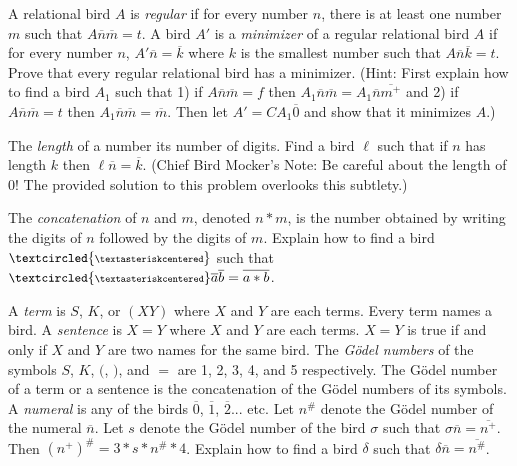 \documentclass[12pt, letterpaper]{article}
\begin{document}
\begin{prob}{24.10}
A relational bird $A$ is \emph{regular} if for every number $n$, there is at least one number $m$ such that $A\overline{n}\overline{m} = t$. A bird $A'$ is a \emph{minimizer} of a regular relational bird $A$ if for every number $n$, $A'\overline{n} = \overline{k}$ where $k$ is the smallest number such that $A\overline{n}\overline{k} = t$. Prove that every regular relational bird has a minimizer. (Hint: First explain how to find a bird $A_1$ such that 1) if $A\overline{n}\overline{m} = f$ then $A_1\overline{n}\overline{m} = A_1\overline{n}\overline{m^+}$ and 2) if $A\overline{n}\overline{m} = t$ then $A_1\overline{n}\overline{m} = \overline{m}$. Then let $A' = CA_1\overline{0}$ and show that it minimizes $A$.)
\end{prob}

\begin{prob}{24.11}
The \emph{length} of a number its number of digits. Find a bird $\ell$ such that if $n$ has length $k$ then $\ell\overline{n} = \overline{k}$. (Chief Bird Mocker's Note: Be careful about the length of 0! The provided solution to this problem overlooks this subtlety.)
\end{prob}

\begin{prob}{24.12}
The \emph{concatenation} of $n$ and $m$, denoted $n \ast m$, is the number obtained by writing the digits of $n$ followed by the digits of $m$. Explain how to find a bird $\small \textcircled{\scriptsize \textasteriskcentered}$ such that $\small \textcircled{\scriptsize \textasteriskcentered}\overline{a}\overline{b} = \overline{a \ast b}$.
\end{prob}

\begin{prob}{25.1}
A \emph{term} is $S$, $K$, or $(XY)$ where $X$ and $Y$ are each terms. Every term names a bird. A \emph{sentence} is $X = Y$ where $X$ and $Y$ are each terms. $X = Y$ is true if and only if $X$ and $Y$ are two names for the same bird. The \emph{G\"{o}del numbers} of the symbols $S$, $K$, $($, $)$, and $=$ are 1, 2, 3, 4, and 5 respectively. The G\"{o}del number of a term or a sentence is the concatenation of the G\"{o}del numbers of its symbols. A \emph{numeral} is any of the birds $\overline{0}$, $\overline{1}$, $\overline{2}$... etc. Let $n^\#$ denote the G\"{o}del number of the numeral $\overline{n}$. Let $s$ denote the G\"{o}del number of the bird $\sigma$ such that $\sigma \overline{n} = \overline{n^+}$. Then $(n^+)^\# = 3 \ast s \ast n^\# \ast 4$. Explain how to find a bird $\delta$ such that $\delta \overline{n} = \overline{n^\#}$.
\end{prob}
\end{document}
